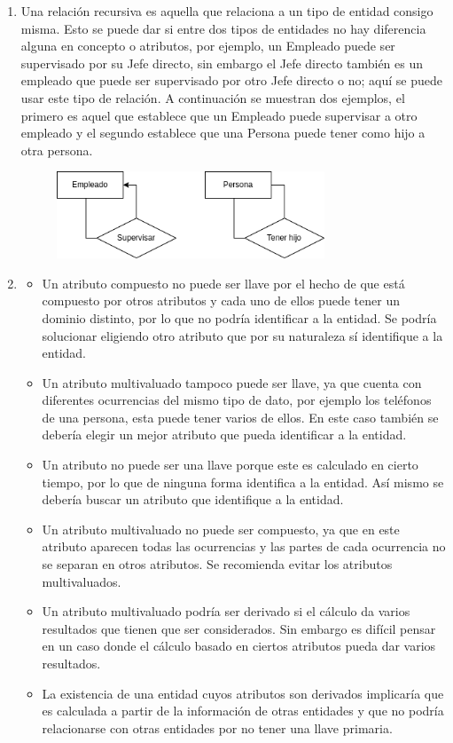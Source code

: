 \documentclass{exam}
\begin{document}
\begin{questions}
\begin{enumerate}[label=\alph*.]
	    \item Una relación recursiva es aquella que relaciona a un tipo de entidad consigo misma. Esto se puede dar si entre dos tipos de entidades no hay diferencia alguna en concepto o atributos, por ejemplo, un Empleado puede ser supervisado por su Jefe directo, sin embargo el Jefe directo también es un empleado que puede ser supervisado por otro Jefe directo o no; aquí se puede usar este tipo de relación. A continuación se muestran dos ejemplos, el primero es aquel que establece que un Empleado puede supervisar a otro empleado y el segundo establece que una Persona puede tener como hijo a otra persona.
	    \begin{figure}[h!]
	        \centering
	        \includegraphics[width=8cm]{imgNolasco/4.png}
	    \end{figure}
	    
	    \newpage
	    \item \begin{itemize}
	    	\item Un atributo compuesto no puede ser llave por el hecho de que está compuesto por otros atributos y cada uno de ellos puede tener un dominio distinto, por lo que no podría identificar a la entidad. Se podría solucionar eligiendo otro atributo que por su naturaleza sí identifique a la entidad.
	    	\item Un atributo multivaluado tampoco puede ser llave, ya que cuenta con diferentes ocurrencias del mismo tipo de dato, por ejemplo los teléfonos de una persona, esta puede tener varios de ellos. En este caso también se debería elegir un mejor atributo que pueda identificar a la entidad.
	    	\item Un atributo no puede ser una llave porque este es calculado en cierto tiempo, por lo que de ninguna forma identifica a la entidad. Así mismo se debería buscar un atributo que identifique a la entidad.
	    	\item Un atributo multivaluado no puede ser compuesto, ya que en este atributo aparecen todas las ocurrencias y las partes de cada ocurrencia no se separan en otros atributos. Se recomienda evitar los atributos multivaluados.
	    	\item Un atributo multivaluado podría ser derivado si el cálculo da varios resultados que tienen que ser considerados. Sin embargo es difícil pensar en un caso donde el cálculo basado en ciertos atributos pueda dar varios resultados.
	    	\item La existencia de una entidad cuyos atributos son derivados implicaría que es calculada a partir de la información de otras entidades y que no podría relacionarse con otras entidades por no tener una llave primaria.
	    \end{itemize}
	    

\end{enumerate}
\end{questions}
\end{document}
